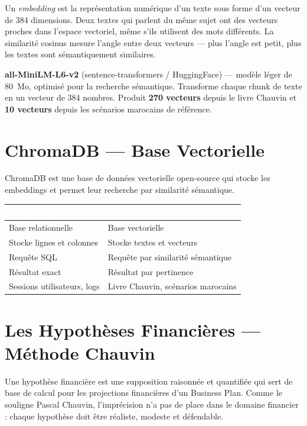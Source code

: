 \documentclass[12pt, a4paper]{report}
\begin{document}
Un \textit{embedding} est la représentation numérique d'un texte sous forme d'un vecteur de 384 dimensions. Deux textes qui parlent du même sujet ont des vecteurs proches dans l'espace vectoriel, même s'ils utilisent des mots différents. La similarité cosinus mesure l'angle entre deux vecteurs — plus l'angle est petit, plus les textes sont sémantiquement similaires.

\begin{formulebox}[title={\bfseries\color{navyblue} Modèle d'embedding utilisé}]
\textbf{all-MiniLM-L6-v2} (sentence-transformers / HuggingFace) — modèle léger de 80~Mo, optimisé pour la recherche sémantique. Transforme chaque chunk de texte en un vecteur de 384 nombres. Produit \textbf{270 vecteurs} depuis le livre Chauvin et \textbf{10 vecteurs} depuis les scénarios marocains de référence.
\end{formulebox}

\section{ChromaDB — Base Vectorielle}

ChromaDB est une base de données vectorielle open-source qui stocke les embeddings et permet leur recherche par similarité sémantique.

\begin{center}
\begin{tabularx}{0.88\textwidth}{X X}
\toprule
\rowcolor{navyblue}\textcolor{white}{\textbf{PostgreSQL}} & \textcolor{white}{\textbf{ChromaDB}} \\
\midrule
\rowcolor{paleblue} Base relationnelle & Base vectorielle \\
Stocke lignes et colonnes & Stocke textes et vecteurs \\
\rowcolor{paleblue} Requête SQL & Requête par similarité sémantique \\
Résultat exact & Résultat par pertinence \\
\rowcolor{paleblue} Sessions utilisateurs, logs & Livre Chauvin, scénarios marocains \\
\bottomrule
\end{tabularx}
\end{center}

\section{Les Hypothèses Financières — Méthode Chauvin}

Une hypothèse financière est une supposition raisonnée et quantifiée qui sert de base de calcul pour les projections financières d'un Business Plan. Comme le souligne Pascal Chauvin, l'imprécision n'a pas de place dans le domaine financier : chaque hypothèse doit être réaliste, modeste et défendable.
\end{document}
